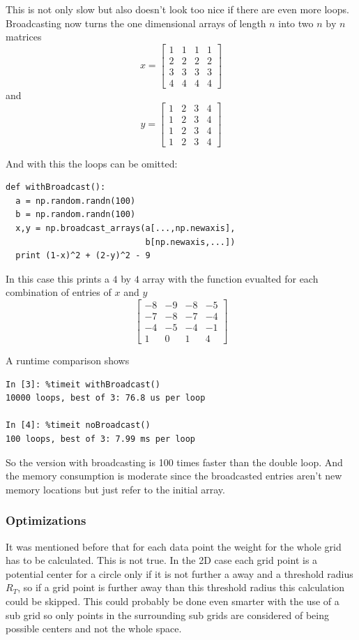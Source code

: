 \documentclass[11pt,twoside]{scrreprt}
\begin{document}
This is not only slow but also doesn't look too nice if there are even more loops.
Broadcasting now turns the one dimensional arrays of length $n$ into two $n\text{ by }n$ matrices
\[
  x = \begin{bmatrix}
  1 & 1 & 1 & 1 \\
  2 & 2 & 2 & 2 \\
  3 & 3 & 3 & 3\\
  4 & 4 & 4 & 4
  \end{bmatrix}
\]
and
\[
  y = \begin{bmatrix}
  1 & 2 & 3 & 4 \\
  1 & 2 & 3 & 4 \\
  1 & 2 & 3 & 4 \\
  1 & 2 & 3 & 4 
\end{bmatrix}
\]
\noindent\begin{minipage}{\linewidth}
And with this the loops can be omitted:
\begin{lstlisting}
def withBroadcast():
  a = np.random.randn(100)
  b = np.random.randn(100) 
  x,y = np.broadcast_arrays(a[...,np.newaxis],
                            b[np.newaxis,...])
  print (1-x)^2 + (2-y)^2 - 9
\end{lstlisting}  
\end{minipage}
In this case this prints a $4$ by $4$ array with the function evualted for each combination of entries of $x$ and $y$
\[
  \begin{bmatrix}
    -8& -9& -8& -5\\
    -7& -8& -7& -4\\
    -4& -5& -4& -1\\
     1&  0&  1&  4
       \end{bmatrix}
\]
%
\begin{minipage}{\linewidth}
A runtime comparison shows   
\begin{lstlisting}
In [3]: %timeit withBroadcast()
10000 loops, best of 3: 76.8 us per loop

In [4]: %timeit noBroadcast()
100 loops, best of 3: 7.99 ms per loop
\end{lstlisting}
So the version with broadcasting is 100 times faster than the double loop. And the memory consumption is moderate since the 
broadcasted entries aren't new memory locations but just refer to the initial array.
\end{minipage}


\subsubsection{Optimizations} %
\label{ssub:optimizations}
It was mentioned before that for each data point the weight for the whole grid has to be calculated. This is not true. In the 2D case 
each grid point is a potential center for a circle only if it is not further a away and a threshold radius $R_T$, so if a grid point is 
further away than this threshold radius this calculation could be skipped. This could probably be done even smarter with the use of a 
sub grid so only points in the surrounding sub grids are considered of being possible centers and not the whole space.
\end{document}
